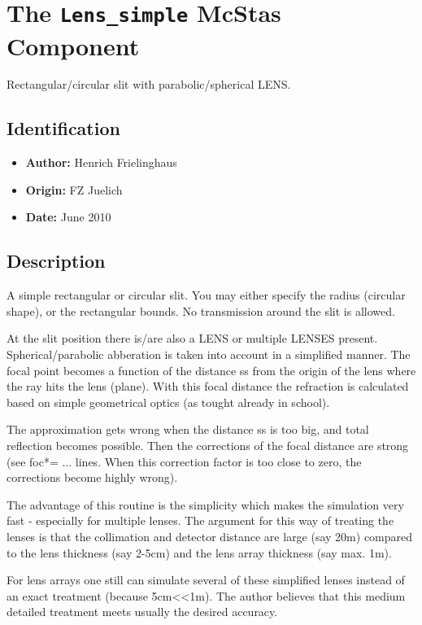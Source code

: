 \section{The \texttt{Lens\_simple} McStas Component}
Rectangular/circular slit with parabolic/spherical LENS.

\subsection*{Identification}
\begin{itemize}
  \item \textbf{Author:} Henrich Frielinghaus
  \item \textbf{Origin:} FZ Juelich
  \item \textbf{Date:} June 2010
\end{itemize}

\subsection*{Description}
A simple rectangular or circular slit. You may either specify the radius (circular shape), or the rectangular bounds. No transmission around the slit is allowed.

At the slit position there is/are also a LENS or multiple LENSES present. Spherical/parabolic abberation is taken into account in a simplified manner. The focal point becomes a function of the distance ss from the origin of the lens where the ray hits the lens (plane). With this focal distance the refraction is calculated based on simple geometrical optics (as tought already in school).

The approximation gets wrong when the distance ss is too big, and total reflection becomes possible. Then the corrections of the focal distance are strong (see foc*= ... lines. When this correction factor is too close to zero, the corrections become highly wrong).

The advantage of this routine is the simplicity which makes the simulation very fast - especially for multiple lenses. The argument for this way of treating the lenses is that the collimation and detector distance are large (say 20m) compared to the lens thickness (say 2-5cm) and the lens array thickness (say max. 1m).

For lens arrays one still can simulate several of these simplified lenses instead of an exact treatment (because 5cm\textless{}\textless{}1m). The author believes that this medium detailed treatment meets usually the desired accuracy.

